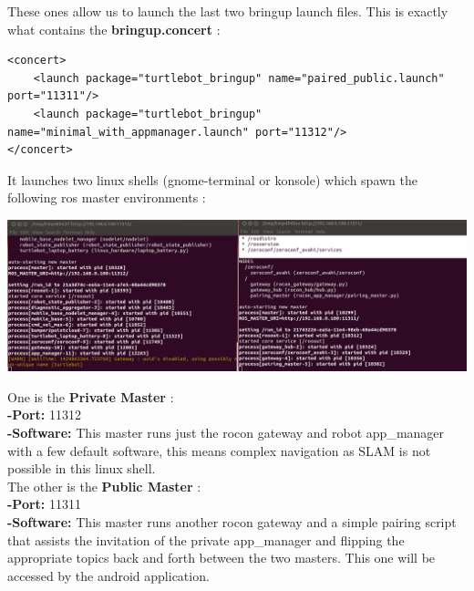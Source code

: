 \documentclass[10pt,a4paper]{article}
\begin{document}
These ones allow us to launch the last two bringup launch files.
This is exactly what contains the \textbf{bringup.concert} : 
\begin{lstlisting}[frame=single]
<concert>
    <launch package="turtlebot_bringup" name="paired_public.launch" port="11311"/>
    <launch package="turtlebot_bringup" name="minimal_with_appmanager.launch" port="11312"/>
</concert>
\end{lstlisting}

It launches two linux shells (gnome-terminal or konsole) which spawn the following ros master environments : 

\begin{center}
\includegraphics[scale=0.4]{images/twoMasters.png}
\end{center}

One is the \textbf{Private Master} : \\
\textbf{-Port:} 11312 \\
\textbf{-Software:} This master runs just the rocon gateway and robot app\_manager with a few default software, this means complex navigation as SLAM is not possible in this linux shell.\\

The other is the \textbf{Public Master} : \\
\textbf{-Port:} 11311 \\
\textbf{-Software:} This master runs another rocon gateway and a simple pairing script that assists the invitation of the private app\_manager and flipping the appropriate topics back and forth between the two masters. This one will be accessed by the android application. 
\end{document}
